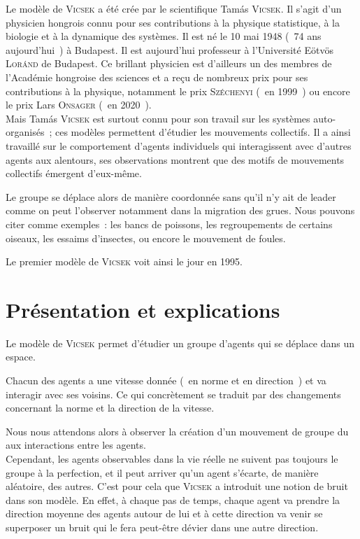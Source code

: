 \documentclass[french, a4paper, 12pt, openany]{report}
\begin{document}
	Le modèle de \textsc{Vicsek} a été crée par le scientifique Tamás \textsc{Vicsek}. Il s'agit d'un physicien hongrois connu pour ses contributions à la physique statistique, à la biologie et à la dynamique des systèmes. Il est né le 10 mai 1948 (~74 ans aujourd'hui~) à Budapest. Il est aujourd'hui professeur à l'Université Eötvös \textsc{Loránd} de Budapest. Ce brillant physicien est d'ailleurs un des membres de l'Académie hongroise des sciences et a reçu de nombreux prix pour ses contributions à la physique, notamment le prix \textsc{Széchenyi} (~en 1999~) ou encore le prix Lars \textsc{Onsager} (~en 2020~). \\

	Mais Tamás \textsc{Vicsek} est surtout connu pour son travail sur les systèmes auto-organisés~; ces modèles permettent d'étudier les mouvements collectifs. Il a ainsi travaillé sur le comportement d'agents individuels qui interagissent avec d'autres agents aux alentours, ses observations montrent que des motifs de mouvements collectifs émergent d'eux-même.
	
	Le groupe se déplace alors de manière coordonnée sans qu'il n'y ait de leader comme on peut l'observer notamment dans la migration des grues. Nous pouvons citer comme exemples~: les bancs de poissons, les regroupements de certains oiseaux, les essaims d'insectes, ou encore le mouvement de foules.

	 Le premier modèle de \textsc{Vicsek} voit ainsi le jour en 1995.\\
	 
	
\chapter{Présentation et explications}	

	Le modèle de \textsc{Vicsek} permet d'étudier un groupe d'agents qui se déplace dans un espace.
	
	Chacun des agents a une vitesse donnée (~en norme et en direction~) et va interagir avec ses voisins. Ce qui concrètement se traduit par des changements concernant la norme et la direction de la vitesse.
	
	Nous nous attendons alors à observer la création d'un mouvement de groupe du aux interactions entre les agents. \\
	
	Cependant, les agents observables dans la vie réelle ne suivent pas toujours le groupe à la perfection, et il peut arriver qu'un agent s'écarte, de manière aléatoire, des autres. C'est pour cela que \textsc{Vicsek} a introduit une notion de bruit dans son modèle. En effet, à chaque pas de temps, chaque agent va prendre la direction moyenne des agents autour de lui et à cette direction va venir se superposer un bruit qui le fera peut-être dévier dans une autre direction.
	
\end{document}
